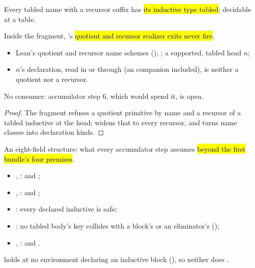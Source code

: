 \begin{definition}
\label{def:TableRecPrefixed}
\leanok
{}
 Every tabled name with a recursor suffix has \hl{its inductive type tabled}; decidable at a
table.
\end{definition}

\begin{lemma}
\label{lem:no_realizer_exit}
\leanok
{}
 Inside the fragment, 's \hl{quotient and recursor realizer exits never
fire}.
\begin{itemize}
\item {} Lean's quotient and recursor name schemes (); ;
a supported, tabled head $n$;
\item {} $n$'s declaration, read in  or through  (an
 companion included), is neither a quotient nor a recursor.
\end{itemize}
 No consumer: accumulator step 6, which would spend it, is open.
\end{lemma}
\begin{proof}
\leanok
{}
 The fragment refuses a quotient primitive by name and a recursor of a tabled inductive at the
head;  widens that to every recursor, and  turns name classes
into declaration kinds.
\end{proof}

\begin{definition}
\label{def:AccAsks}
\leanok
{}
 An eight-field structure: what every accumulator step assumes \hl{beyond the first
bundle's four premises}.
\begin{itemize}
\item {}, :  and ;
\item {}, :  and ;
\item {}: every declared inductive is safe;
\item {}: no tabled body's key collides with a block's or an eliminator's
();
\item {}, :  and .
\end{itemize}
  holds at no environment declaring an inductive block
(), so neither does .
\end{definition}

